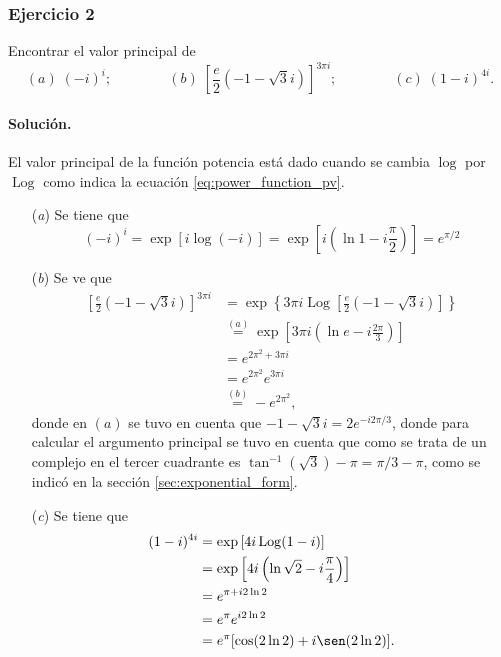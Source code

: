 \documentclass[a4paper]{report}
\DeclareMathOperator{\Log}{Log}
\begin{document}
\subsubsection{Ejercicio 2}

Encontrar el valor principal de 
\[
 (\textit{a})\;(-i)^i;\qquad\qquad 
 (\textit{b})\;\left[\frac{e}{2}(-1-\sqrt{3}i)\right]^{3\pi i};\qquad\qquad
 (\textit{c})\;(1-i)^{4i}.
\]

\paragraph{Solución.}

El valor principal de la función potencia está dado cuando se cambia \(\log\) por \(\Log\) como indica la ecuación \ref{eq:power_function_pv}.

\begin{enumerate}
 \item[(\textit{a})] Se tiene que
 \[
  (-i)^i=\exp[i\log(-i)]=\exp\left[i\left(\ln1-i\frac{\pi}{2}\right)\right]=e^{\pi/2}
 \]
 \item[(\textit{b})] Se ve que 
 \begin{align*}
  \left[\frac{e}{2}(-1-\sqrt{3}i)\right]^{3\pi i}&=\exp\left\{3\pi i\Log\left[\frac{e}{2}(-1-\sqrt{3}i)\right]\right\}\\
  &\overset{(a)}{=}\exp\left[3\pi i\left(\ln e-i\frac{2\pi}{3}\right)\right]\\
  &=e^{2\pi^2+3\pi i}\\
  &=e^{2\pi^2}e^{3\pi i}\\
  &\overset{(b)}{=}-e^{2\pi^2},
 \end{align*}
 donde en \((a)\) se tuvo en cuenta que \(-1-\sqrt{3}i=2e^{-i2\pi/3}\), donde para calcular el argumento principal se tuvo en cuenta que como se trata de un complejo en el tercer cuadrante es \(\tan^{-1}(\sqrt{3})-\pi=\pi/3-\pi\), como se indicó en la sección \ref{sec:exponential_form}.
 \item[(\textit{c})] Se tiene que 
 \begin{align*}
  (1-i)^{4i}&=\exp\left[4i\Log(1-i)\right]\\
   &=\exp\left[4i\left(\ln\sqrt{2}-i\frac{\pi}{4}\right)\right]\\
   &=e^{\pi+i2\ln2}\\
   &=e^{\pi}e^{i2\ln2}\\
   &=e^{\pi}[\cos(2\ln2)+i\sen(2\ln2)].
 \end{align*}
\end{enumerate} 
\end{document}
